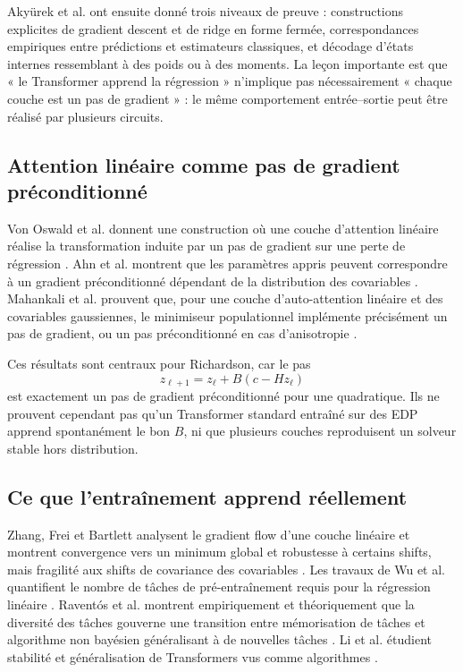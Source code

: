 \documentclass[11pt,a4paper]{article}
\begin{document}
Akyürek et al. ont ensuite donné trois niveaux de preuve
\cite{akyurek2023}: constructions explicites de gradient descent et de ridge en
forme fermée, correspondances empiriques entre prédictions et estimateurs
classiques, et décodage d'états internes ressemblant à des poids ou à des
moments. La leçon importante est que « le Transformer apprend la régression »
n'implique pas nécessairement « chaque couche est un pas de gradient » : le
même comportement entrée--sortie peut être réalisé par plusieurs circuits.

\subsection{Attention linéaire comme pas de gradient préconditionné}

Von Oswald et al. donnent une construction où une couche d'attention linéaire
réalise la transformation induite par un pas de gradient sur une perte de
régression \cite{vonoswald2023}. Ahn et al. montrent que les paramètres appris
peuvent correspondre à un gradient préconditionné dépendant de la distribution
des covariables \cite{ahn2023preconditioned}. Mahankali et al. prouvent que,
pour une couche d'auto-attention linéaire et des covariables gaussiennes, le
minimiseur populationnel implémente précisément un pas de gradient, ou un pas
préconditionné en cas d'anisotropie \cite{mahankali2023}.

Ces résultats sont centraux pour Richardson, car le pas
\[
  z_{\ell+1}=z_\ell+B(c-Hz_\ell)
\]
est exactement un pas de gradient préconditionné pour une quadratique. Ils ne
prouvent cependant pas qu'un Transformer standard entraîné sur des EDP apprend
spontanément le bon $B$, ni que plusieurs couches reproduisent un solveur
stable hors distribution.

\subsection{Ce que l'entraînement apprend réellement}

Zhang, Frei et Bartlett analysent le gradient flow d'une couche linéaire et
montrent convergence vers un minimum global et robustesse à certains shifts,
mais fragilité aux shifts de covariance des covariables
\cite{zhang2023trained}. Les travaux de Wu et al. quantifient le nombre de
tâches de pré-entraînement requis pour la régression linéaire
\cite{wu2024tasks}. Raventós et al. montrent empiriquement et théoriquement que
la diversité des tâches gouverne une transition entre mémorisation de tâches et
algorithme non bayésien généralisant à de nouvelles tâches
\cite{raventos2023}. Li et al. étudient stabilité et généralisation de
Transformers vus comme algorithmes \cite{li2023algorithms}.
\end{document}
